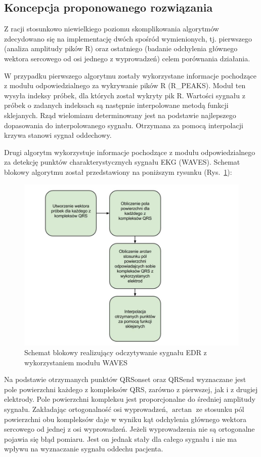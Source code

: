\subsection{Koncepcja proponowanego rozwiązania}

	Z racji stosunkowo niewielkiego poziomu skomplikowania algorytmów zdecydowano się na implementację dwóch spośród wymienionych, tj. pierwszego (analiza amplitudy pików R) oraz ostatniego (badanie odchylenia głównego wektora sercowego od osi jednego z wyprowadzeń) celem porównania działania.
	
	W przypadku pierwszego algorytmu zostały wykorzystane informacje pochodzące z modułu odpowiedzialnego za wykrywanie pików R (R\_PEAKS). Moduł ten wysyła indeksy próbek, dla których został wykryty pik R. Wartości sygnału z próbek o zadanych indeksach są następnie  interpolowane metodą funkcji sklejanych. Rząd wielomianu determinowany jest na podstawie najlepszego dopasowania do interpolowanego sygnału.	Otrzymana za pomocą interpolacji krzywa stanowi sygnał oddechowy.

	Drugi algorytm wykorzystuje informacje pochodzące z modułu odpowiedzialnego za detekcję punktów charakterystycznych sygnału EKG (WAVES). Schemat blokowy algorytmu został przedstawiony na poniższym rysunku (Rys.~\ref{fig:graf}):
	
\begin{figure}[ht]
\centering
\includegraphics[width=12cm]{SIG_EDR/img/graf.jpg}
\caption{Schemat blokowy realizujący odczytywanie sygnału EDR z wykorzystaniem modułu WAVES}
\label{fig:graf}
\end{figure}	
	
	 Na podstawie otrzymanych punktów QRSonset oraz QRSend wyznaczane jest pole powierzchni każdego z kompleksów QRS, zarówno z pierwszej, jak i z drugiej elektrody. Pole powierzchni kompleksu jest proporcjonalne do średniej amplitudy sygnału. Zakładając ortogonalność osi wyprowadzeń, $\arctan$ ze stosunku pól powierzchni obu kompleksów daje w wyniku kąt odchylenia głównego wektora sercowego od jednej z osi wyprowadzeń. Jeżeli wyprowadzenia nie są ortogonalne pojawia się błąd pomiaru. Jest on jednak stały dla całego sygnału i nie ma wpływu na wyznaczanie sygnału oddechu pacjenta.

